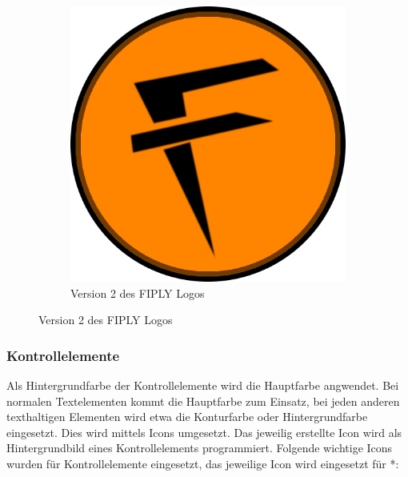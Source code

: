 \documentclass[FIPLY_base.tex]{subfiles}
\begin{document}
	\begin{figure}[H]
		\begin{subfigure}[b]{1\textwidth}
			\centering
			\includegraphics[scale=0.75]{img/icons/Version2}
			\centering
			\caption{Version 2 des FIPLY Logos}
		\end{subfigure}
	\end{figure}
	\subsubsection{Kontrollelemente}
	Als Hintergrundfarbe der Kontrollelemente wird die Hauptfarbe angwendet. Bei normalen Textelementen kommt die Hauptfarbe zum Einsatz, bei jeden anderen texthaltigen Elementen wird etwa die Konturfarbe oder Hintergrundfarbe eingesetzt. Dies wird mittels Icons umgesetzt. Das jeweilig erstellte Icon wird als Hintergrundbild eines Kontrollelements programmiert. Folgende wichtige Icons wurden für Kontrollelemente eingesetzt, das jeweilige Icon wird eingesetzt für *:
	
\end{document}
